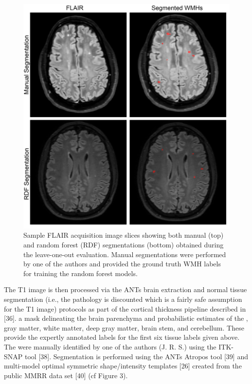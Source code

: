 \documentclass[11pt,]{article}
\begin{document}
\begin{figure}[htbp]
\centering
\includegraphics{Figures/montage.png}
\caption{Sample FLAIR acquisition image slices showing both manual (top)
and random forest (RDF) segmentations (bottom) obtained during the
leave-one-out evaluation. Manual segmentations were performed by one of
the authors and provided the ground truth WMH labels for training the
random forest models.}
\end{figure}

The T1 image is then processed via the ANTs brain extraction and normal
tissue segmentation (i.e., the pathology is discounted which is a fairly
safe assumption for the T1 image) protocols as part of the cortical
thickness pipeline described in {[}36{]}.
 a mask delineating the brain
parenchyma and probabilistic estimates of the
, gray matter, white
matter, deep gray matter, brain stem, and cerebellum. These provide the
expertly annotated labels for the first six tissue labels given above.
The  were manually
identified by one of the authors (J. R. S.) using the ITK-SNAP tool
{[}38{]}. Segmentation is performed using the ANTs Atropos tool {[}39{]}
and multi-model optimal symmetric shape/intensity templates {[}26{]}
created from the public MMRR data set {[}40{]} (cf Figure 3).
\end{document}
